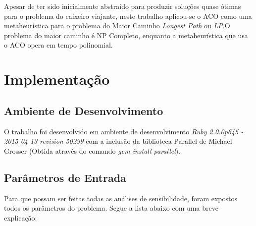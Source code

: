 \documentclass{article}
\begin{document}
\newline
\par
Apesar de ter sido inicialmente abstraído para produzir soluções quase ótimas para o problema do caixeiro viajante, neste trabalho aplicou-se o ACO como uma metaheurística para o problema do Maior Caminho \textit{Longest Path} ou \textit{LP}.O problema do maior caminho é NP Completo, enquanto a metaheurística que usa o ACO opera em tempo polinomial.


\section{Implementação}
\subsection{Ambiente de Desenvolvimento}
\par
O trabalho foi desenvolvido em ambiente de desenvolvimento \textit{ Ruby 2.0.0p645 - 2015-04-13 revision 50299 } com a inclusão da biblioteca Parallel de Michael Grosser (Obtida através do comando \textit{gem install parallel}). 
\subsection{Parâmetros de Entrada}
Para que possam ser feitas todas as análises de sensibilidade, foram expostos todos os parâmetros do problema. Segue a lista abaixo com uma breve explicação:
\end{document}
